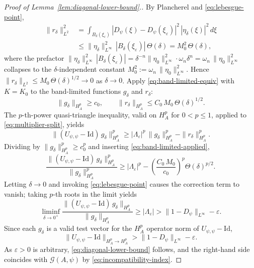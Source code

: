 \documentclass[pdflatex,sn-basic,Numbered]{sn-jnl}
\theoremstyle{thmstyleone}%
\theoremstyle{thmstylethree}%
\begin{document}
\begin{proof}[Proof of Lemma~\ref{lem:diagonal-lower-bound}.]
	By Plancherel and \eqref{eq:lebesgue-point},
	\begin{equation*}\label{eq:remainder-L2}
		\begin{aligned}
			\|r_\delta\|_{L^2}^2
			&= \int_{B_\delta(\xi_\varepsilon)}
			|D_\psi(\xi) - D_\psi(\xi_\varepsilon)|^2\, |\eta_\delta(\xi)|^2 \, d\xi \\
			&\le \|\eta_\delta\|_{L^\infty}^2\, |B_\delta(\xi_\varepsilon)|\, \Theta(\delta)
			 =  M_0^2\, \Theta(\delta),
		\end{aligned}
	\end{equation*}
	where the prefactor $\|\eta_\delta\|_{L^\infty}^2 \, |B_\delta(\xi_\varepsilon)|
	= \delta^{-n}\|\eta_0\|_{L^\infty}^2 \cdot \omega_n\delta^n
	= \omega_n\,\|\eta_0\|_{L^\infty}^2$ collapses to the $\delta$-independent
	constant $M_0^2 := \omega_n\,\|\eta_0\|_{L^\infty}^2$. Hence
	$\|r_\delta\|_{L^2}\le M_0\, \Theta(\delta)^{1/2}\to 0$ as $\delta \to 0$.
	Apply \eqref{eq:band-limited-equiv} with $K = K_0$ to the band-limited
	functions $g_\delta$ and $r_\delta$:
	\begin{equation}\label{eq:band-limited-applied}
		\|g_\delta\|_{H^p_A}\ge c_0,
		\qquad
		\|r_\delta\|_{H^p_A}\le C_0\, M_0\, \Theta(\delta)^{1/2}.
	\end{equation}
	The $p$-th-power quasi-triangle inequality, valid on $H^p_A$ for
	$0 < p \le 1$, applied to \eqref{eq:multiplier-split}, yields
	\begin{equation*}\label{eq:p-triangle}
		\|(U_{\psi,\psi} - \mathrm{Id})\, g_\delta\|_{H^p_A}^p
		 \ge  |\Lambda_\varepsilon|^p\, \|g_\delta\|_{H^p_A}^p
		- \|r_\delta\|_{H^p_A}^p .
	\end{equation*}
	Dividing by $\|g_\delta\|_{H^p_A}^p \ge c_0^p$ and inserting
	\eqref{eq:band-limited-applied},
	\begin{equation*}\label{eq:ratio-bound}
		\frac{\|(U_{\psi,\psi} - \mathrm{Id})\, g_\delta\|_{H^p_A}^p}{\|g_\delta\|_{H^p_A}^p}
		 \ge  |\Lambda_\varepsilon|^p
		- \left(\frac{C_0\, M_0}{c_0}\right)^{\!p}\! \Theta(\delta)^{p/2}.
	\end{equation*}
	Letting $\delta \to 0$ and invoking \eqref{eq:lebesgue-point} causes the
	correction term to vanish; taking $p$-th roots in the limit yields
	\begin{equation*}\label{eq:final-ratio}
		\liminf_{\delta \to 0^+}
		\frac{\|(U_{\psi,\psi} - \mathrm{Id})\, g_\delta\|_{H^p_A}}{\|g_\delta\|_{H^p_A}}
		 \ge  |\Lambda_\varepsilon|
		 >  \|1 - D_\psi\|_{L^\infty} - \varepsilon .
	\end{equation*}
	Since each $g_\delta$ is a valid test vector for the $H^p_A$ operator norm of
	$U_{\psi,\psi} - \mathrm{Id}$,
	\begin{equation*}\label{eq:hp-lower-bound}
		\|U_{\psi,\psi} - \mathrm{Id}\|_{H^p_A \to H^p_A}
		 >  \|1 - D_\psi\|_{L^\infty} - \varepsilon .
	\end{equation*}
	As $\varepsilon > 0$ is arbitrary, \eqref{eq:diagonal-lower-bound} follows, and
	the right-hand side coincides with $\mathcal{G}(A,\psi)$ by
	\eqref{eq:incompatibility-index}.
\end{proof}
\end{document}
